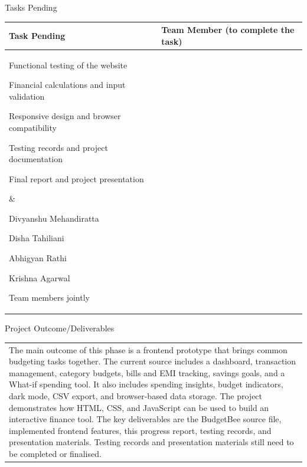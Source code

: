 \documentclass[12pt,a4paper]{article}
\newcommand{\sectiontitle}[1]{%
    {\color{GEUBlue}
    \fontsize{18}{22}\selectfont #1}
}
\newcommand{\answerbox}[2]{%
    \begin{tabularx}{\textwidth}{
        |>{\raggedright\arraybackslash}X|}
        \hline
        \parbox[t][#1][t]{\dimexpr\linewidth-12pt\relax}{
            \vspace{5pt}
            \fontsize{11}{13}\selectfont #2
        }\\
        \hline
    \end{tabularx}
}
\begin{document}
\sectiontitle{Tasks Pending}


\vspace{0.18cm}

\begin{tabularx}{\textwidth}{
|>{\raggedright\arraybackslash}X
|>{\raggedright\arraybackslash}X|
}
\hline

\textbf{Task Pending} &
\textbf{Team Member (to complete the task)}
\\
\hline

\parbox[t][4.15cm][t]{\linewidth}{
\begin{compresslist}
    \item Functional testing of the website 
    \item Financial calculations and input validation 
    \item Responsive design and browser compatibility 
    \item Testing records and project documentation 
    \item Final report and project presentation 
\end{compresslist} 
}
&
\parbox[t][4.15cm][t]{\linewidth}{
\begin{compresslist}
    \item Divyanshu Mehandiratta
    \item Disha Tahiliani
    \item Abhigyan Rathi
    \item Krishna Agarwal
    \item Team members jointly
\end{compresslist} 
}
\\
\hline

\end{tabularx}

\newpage


\vspace*{0.30cm}

\sectiontitle{Project Outcome/Deliverables}

\vspace{0.35cm}

\answerbox{3.45cm}{The main outcome of this phase is a frontend prototype that brings common budgeting tasks together. The current source
includes a dashboard, transaction management, category budgets, bills and EMI tracking, savings goals, and a What-if
spending tool. It also includes spending insights, budget indicators, dark mode, CSV export, and browser-based data
storage. The project demonstrates how HTML, CSS, and JavaScript can be used to build an interactive finance tool. The
key deliverables are the BudgetBee source file, implemented frontend features, this progress report, testing records, and
presentation materials. Testing records and presentation materials still need to be completed or finalised.}
\end{document}
